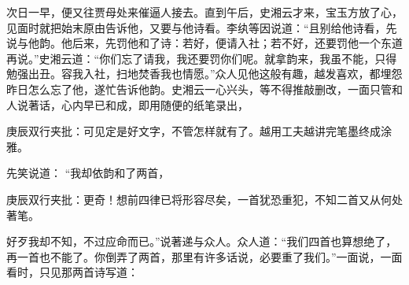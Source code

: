 \begin{parag}
    次日一早，便又往贾母处来催逼人接去。直到午后，史湘云才来，宝玉方放了心，见面时就把始末原由告诉他，又要与他诗看。李纨等因说道：“且别给他诗看，先说与他韵。他后来，先罚他和了诗：若好，便请入社；若不好，还要罚他一个东道再说。”史湘云道：“你们忘了请我，我还要罚你们呢。就拿韵来，我虽不能，只得勉强出丑。容我入社，扫地焚香我也情愿。”众人见他这般有趣，越发喜欢，都埋怨昨日怎么忘了他，遂忙告诉他韵。史湘云一心兴头，等不得推敲删改，一面只管和人说著话，心内早已和成，即用随便的纸笔录出，\begin{note}庚辰双行夹批：可见定是好文字，不管怎样就有了。越用工夫越讲完笔墨终成涂雅。\end{note}先笑说道： “我却依韵和了两首，\begin{note}庚辰双行夹批：更奇！想前四律已将形容尽矣，一首犹恐重犯，不知二首又从何处著笔。\end{note}好歹我却不知，不过应命而已。”说著递与众人。众人道：“我们四首也算想绝了，再一首也不能了。你倒弄了两首，那里有许多话说，必要重了我们。”一面说，一面看时，只见那两首诗写道：
\end{parag}
